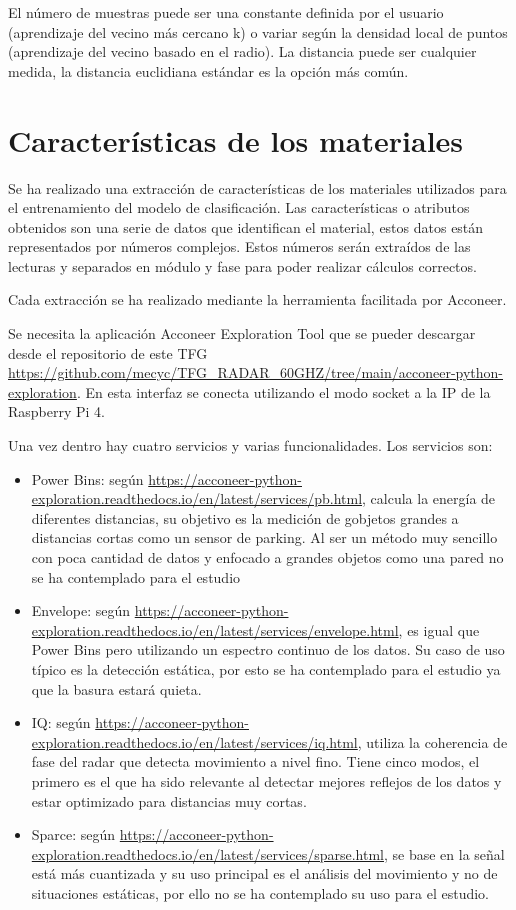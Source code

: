 
El número de muestras puede ser una constante definida por el usuario (aprendizaje del vecino más cercano k) o variar según la densidad local de puntos (aprendizaje del vecino basado en el radio). La distancia puede ser cualquier medida, la distancia euclidiana estándar es la opción más común.

\section{Características de los materiales}

Se ha realizado una extracción de características de los materiales utilizados para el entrenamiento del modelo de clasificación. Las características o atributos obtenidos son una serie de datos que identifican el material, estos datos están representados por números complejos. Estos números serán extraídos de las lecturas y separados en módulo y fase para poder realizar cálculos correctos.

Cada extracción se ha realizado mediante la herramienta facilitada por Acconeer.



Se necesita la aplicación Acconeer Exploration Tool que se pueder descargar desde el repositorio de este TFG \url{https://github.com/mecyc/TFG_RADAR_60GHZ/tree/main/acconeer-python-exploration}. En esta interfaz se conecta utilizando el modo socket a la IP de la Raspberry Pi 4.
 
Una vez dentro hay cuatro servicios y varias funcionalidades. Los servicios son:
\begin{itemize}
\item Power Bins: según \url{https://acconeer-python-exploration.readthedocs.io/en/latest/services/pb.html}, calcula la energía de diferentes distancias, su objetivo es la medición de gobjetos grandes a distancias cortas como un sensor de parking. Al ser un método muy sencillo con poca cantidad de datos y enfocado a grandes objetos como una pared no se ha contemplado para el estudio
\item Envelope: según \url{https://acconeer-python-exploration.readthedocs.io/en/latest/services/envelope.html}, es igual que Power Bins pero utilizando un espectro continuo de los datos. Su caso de uso típico es la detección estática, por esto se ha contemplado para el estudio ya que la basura estará quieta.
\item IQ: según \url{https://acconeer-python-exploration.readthedocs.io/en/latest/services/iq.html}, utiliza la coherencia de fase del radar que detecta movimiento a nivel fino. Tiene cinco modos, el primero es el que ha sido relevante al detectar mejores reflejos de los datos y estar optimizado para distancias muy cortas.
\item Sparce: según \url{https://acconeer-python-exploration.readthedocs.io/en/latest/services/sparse.html}, se base en la señal está más cuantizada y su uso principal es el análisis del movimiento y no de situaciones estáticas, por ello no se ha contemplado su uso para el estudio.
\end{itemize}


